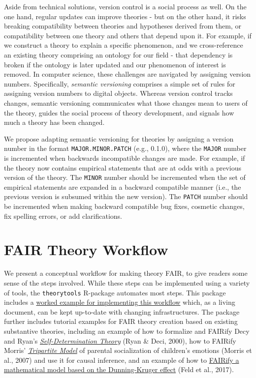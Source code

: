 \documentclass[
  man, noextraspace,floatsintext]{apa7}
\begin{document}
Aside from technical solutions, version control is a social process as well.
On the one hand, regular updates can improve theories - but on the other hand, it risks breaking compatibility between theories and hypotheses derived from them, or compatibility between one theory and others that depend upon it.
For example, if we construct a theory to explain a specific phenomenon, and we cross-reference an existing theory comprising an ontology for our field - that dependency is broken if the ontology is later updated and our phenomenon of interest is removed.
In computer science, these challenges are navigated by assigning version numbers.
Specifically, \emph{semantic versioning} comprises a simple set of rules for assigning version numbers to digital objects.
Whereas version control tracks changes,
semantic versioning communicates what those changes mean to users of the theory,
guides the social process of theory development, and signals how much a theory has been changed.

We propose adapting semantic versioning for theories by assigning a version number in the format \texttt{MAJOR.MINOR.PATCH} (e.g., 0.1.0), where the \texttt{MAJOR} number is incremented when backwards incompatible changes are made. For example, if the theory now contains empirical statements that are at odds with a previous version of the theory. The \texttt{MINOR} number should be incremented when the set of empirical statements are expanded in a backward compatible manner (i.e., the previous version is subsumed within the new version). The \texttt{PATCH} number should be incremented when making backward compatible bug fixes, cosmetic changes, fix spelling errors, or add clarifications.

\section{FAIR Theory Workflow}\label{fair-theory-workflow}

We present a conceptual workflow for making theory FAIR,
to give readers some sense of the steps involved.
While these steps can be implemented using a variety of tools,
the \texttt{theorytools} R-package automates most steps.
This package includes a \href{https://cjvanlissa.github.io/theorytools/articles/fair-theory.html}{worked example for implementing this workflow} which, as a living document,
can be kept up-to-date with changing infrastructures.
The package further includes tutorial examples for FAIR theory creation based on existing substantive theories, including
an example of how to formalize and FAIRify Decy and Ryan's \href{https://cjvanlissa.github.io/theorytools/articles/formalizing_sdt.html}{\emph{Self-Determination Theory}} (Ryan \& Deci, 2000),
how to FAIRify Morris' \href{https://cjvanlissa.github.io/theorytools/articles/causal-inference.html}{\emph{Tripartite Model}} of parental socialization of children's emotions (Morris et al., 2007) and use it for causal inference,
and an example of how to \href{https://cjvanlissa.github.io/theorytools/articles/dunning-kruger.html}{FAIRify a mathematical model based on the Dunning-Kruger effect} (Feld et al., 2017).
\end{document}
